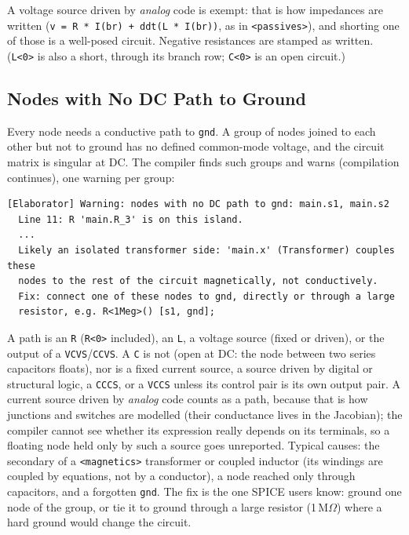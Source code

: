 \documentclass[11pt, a4paper]{article}
\newcommand{\code}[1]{\texttt{\small #1}}
\begin{document}
\noindent A voltage source driven by \textit{analog} code is exempt: that is
how impedances are written (\code{v = R * I(br) + ddt(L * I(br))}, as in
\code{<passives>}), and shorting one of those is a well-posed circuit.
Negative resistances are stamped as written. (\code{L<0>} is also a short,
through its branch row; \code{C<0>} is an open circuit.)

\subsection{Nodes with No DC Path to Ground}
\label{sec:floating}

Every node needs a conductive path to \code{gnd}. A group of nodes joined to
each other but not to ground has no defined common-mode voltage, and the
circuit matrix is singular at DC. The compiler finds such groups and warns
(compilation continues), one warning per group:

\begin{lstlisting}
[Elaborator] Warning: nodes with no DC path to gnd: main.s1, main.s2
  Line 11: R 'main.R_3' is on this island.
  ...
  Likely an isolated transformer side: 'main.x' (Transformer) couples these
  nodes to the rest of the circuit magnetically, not conductively.
  Fix: connect one of these nodes to gnd, directly or through a large
  resistor, e.g. R<1Meg>() [s1, gnd];
\end{lstlisting}

\noindent A path is an \code{R} (\code{R<0>} included), an \code{L}, a voltage source (fixed or
driven), or the output of a \code{VCVS}/\code{CCVS}. A \code{C} is not (open
at DC: the node between two series capacitors floats), nor is a fixed current
source, a source driven by digital or structural logic, a \code{CCCS}, or a
\code{VCCS} unless its control pair is its own output pair. A current source
driven by \textit{analog} code counts as a path, because that is how junctions
and switches are modelled (their conductance lives in the Jacobian); the
compiler cannot see whether its expression really depends on its terminals, so
a floating node held only by such a source goes unreported. Typical causes: the
secondary of a \code{<magnetics>} transformer or coupled inductor (its windings
are coupled by equations, not by a conductor), a node reached only through
capacitors, and a forgotten \code{gnd}. The fix is the one SPICE users know:
ground one node of the group, or tie it to ground through a large resistor
(1\,M$\Omega$) where a hard ground would change the circuit.
\end{document}
